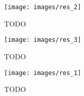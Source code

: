 \begin{figure}
\centerline{\texttt{[image: images/res\_2]}}
\caption[TODO]{TODO}
\label{obr:res_2}
\end{figure}

\begin{figure}
\centerline{\texttt{[image: images/res\_3]}}
\caption[TODO]{TODO}
\label{obr:res_3}
\end{figure}

\begin{figure}
\centerline{\texttt{[image: images/res\_1]}}
\caption[TODO]{TODO}
\label{obr:res_1}
\end{figure}
